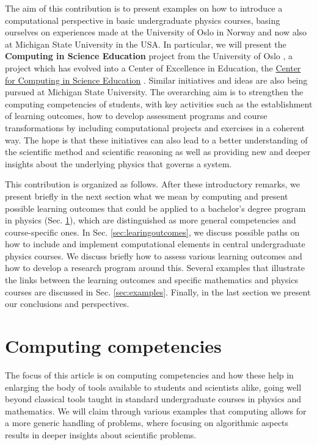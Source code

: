 \documentclass[graybox,envcountchap,sectrefs]{svmult}
\begin{document}
The aim of this contribution is to present examples on how to
introduce a computational perspective in basic undergraduate physics
courses, basing ourselves on experiences made at the University of
Oslo in Norway and now also at Michigan State University in the
USA. In particular, we will present the \textbf{Computing in Science
Education} project from the University of Oslo \cite{CSEUiO}, a project which has
evolved into a Center of Excellence in Education, the \href{{http://www.mn.uio.no/ccse/english/}}{Center for
Computing in Science
Education} \cite{CCSEUiO}. Similar initiatives
and ideas are also being pursued at Michigan State University.  The
overarching aim is to strengthen the computing  competencies of
students, with key activities such as the establishment of learning
outcomes, how to develop assessment programs and course
transformations by including computational projects and exercises in a
coherent way. The hope is that these initiatives can also lead to a
better understanding of the scientific method and scientific reasoning
as well as providing new and deeper insights about the underlying physics that governs a system.

This contribution is organized as follows. After these introductory
remarks, we present briefly in the next section what we mean by computing and present
possible learning outcomes that could be applied to a bachelor's degree
program in physics (Sec. \ref{sec:competencies}), which are distinguished as more general competencies and course-specific ones.  In Sec. \ref{sec:learingoutcomes}, we discuss possible paths on how to include and implement
computational elements in central undergraduate physics courses. We discuss briefly
how to assess various learning outcomes and how to develop a research program around this.
Several examples that illustrate the links between the learning outcomes and specific mathematics and physics courses
are discussed in Sec. \ref{sec:examples}.
Finally, in the last section we present our conclusions and perspectives.


\section{Computing competencies} \label{sec:competencies}

The focus of this article is on computing competencies and how
these help in enlarging the body of tools available to students and
scientists alike, going well beyond classical tools taught in standard
undergraduate courses in physics and mathematics. We will claim through various
examples that computing  allows for a more generic handling of
problems, where focusing on algorithmic aspects results in deeper
insights about scientific problems.
\end{document}
